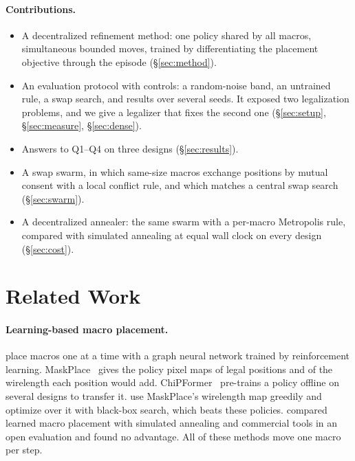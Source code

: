 \documentclass[10pt]{article}
\begin{document}
\paragraph{Contributions.}
\begin{itemize}[leftmargin=1.2em]
\item A decentralized refinement method: one policy shared by all macros, simultaneous bounded moves, trained by differentiating the placement objective through the episode (\S\ref{sec:method}).
\item An evaluation protocol with controls: a random-noise band, an untrained rule, a swap search, and results over several seeds. It exposed two legalization problems, and we give a legalizer that fixes the second one (\S\ref{sec:setup}, \S\ref{sec:measure}, \S\ref{sec:dense}).
\item Answers to Q1--Q4 on three designs (\S\ref{sec:results}).
\item A swap swarm, in which same-size macros exchange positions by mutual consent with a local conflict rule, and which matches a central swap search (\S\ref{sec:swarm}).
\item A decentralized annealer: the same swarm with a per-macro Metropolis rule, compared with simulated annealing at equal wall clock on every design (\S\ref{sec:cost}).
\end{itemize}

\section{Related Work}

\paragraph{Learning-based macro placement.} \citet{mirhoseini2021graph} place macros one at a time with a graph neural network trained by reinforcement learning. MaskPlace~\citep{lai2022maskplace} gives the policy pixel maps of legal positions and of the wirelength each position would add. ChiPFormer~\citep{lai2023chipformer} pre-trains a policy offline on several designs to transfer it. \citet{shi2023wiremask} use MaskPlace's wirelength map greedily and optimize over it with black-box search, which beats these policies. \citet{cheng2023assessment} compared learned macro placement with simulated annealing and commercial tools in an open evaluation and found no advantage. All of these methods move one macro per step.
\end{document}
